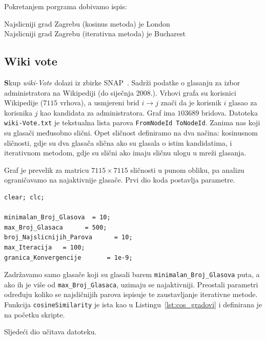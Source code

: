 \documentclass[12pt, letterpaper]{article}
\numberwithin{figure}{section}
\begin{document}
Pokretanjem porgrama dobivamo ispis:

Najslicniji grad Zagrebu (kosinus metoda) je London\\
Najslicniji grad Zagrebu (iterativna metoda) je Bucharest

\subsection{Wiki vote}

\textbf
Skup \emph{wiki-Vote} dolazi iz zbirke SNAP~\cite{leskovec2010}. Sadrži podatke o glasanju za izbor administratora na Wikipediji (do siječnja 2008.). Vrhovi grafa su korisnici Wikipedije ($7115$ vrhova), a usmjereni brid $i\to j$ znači da je korisnik $i$ glasao za korisnika $j$ kao kandidata za administratora. Graf ima $103689$ bridova. Datoteka \texttt{wiki-Vote.txt} je tekstualna lista parova \texttt{FromNodeId ToNodeId}. Zanima nas koji su glasači međusobno slični. Opet sličnost definiramo na dva načina: kosinusnom sličnosti, gdje su dva glasača slična ako su glasala o istim kandidatima, i iterativnom metodom, gdje su slični ako imaju sličnu ulogu u mreži glasanja.

Graf je prevelik za matricu $7115\times 7115 $ sličnosti u punom obliku, pa analizu ograničavamo na najaktivnije glasače. Prvi dio koda postavlja parametre.

\begin{lstlisting}[style=octave, caption={Parametri analize}, label={lst:wiki_parametri}]
clear; clc;

minimalan_Broj_Glasova  = 10;    
max_Broj_Glasaca      = 500;     
broj_Najslicnijih_Parova      = 10;      
max_Iteracija   = 100;     
granica_Konvergencije       = 1e-9;
\end{lstlisting}
Zadržavamo samo glasače koji su glasali barem \texttt{minimalan\_Broj\_Glasova} puta, a ako ih je više od \texttt{max\_Broj\_Glasaca}, uzimaju se najaktivniji. Preostali parametri određuju koliko se najsličnijih parova ispisuje te zaustavljanje iterativne metode. Funkcija \texttt{cosineSimilarity} je ista kao u Listingu~\ref{lst:cos_gradovi} i definirana je na početku skripte.

Sljedeći dio učitava datoteku. 
\end{document}
